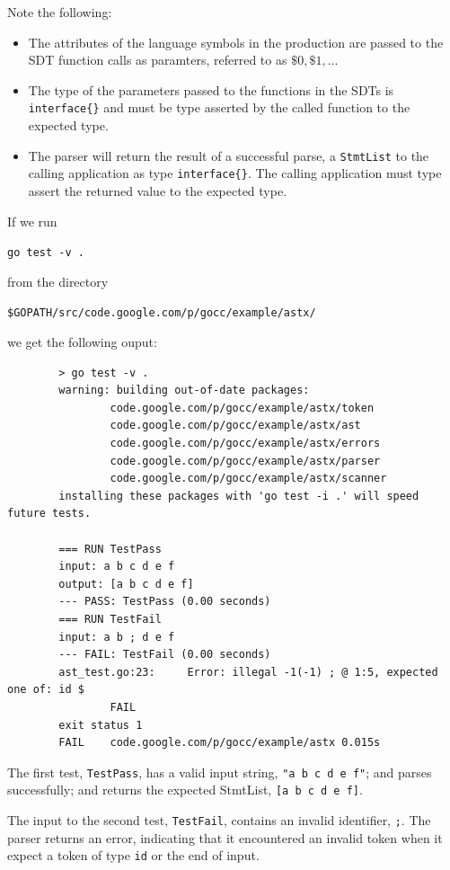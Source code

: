 \documentclass[12pt]{article}
\begin{document}
	Note the following:

	\begin{itemize}
		\item The attributes of the language symbols in the production are passed to the SDT function calls as paramters, referred to as $\$0, \$1, ...$

		\item The type of the parameters passed to the functions in the SDTs is \verb|interface{}| and must be type asserted by the called function to the expected type.

		\item The parser will return the result of a successful parse, a \verb"StmtList" to the calling application as type \verb"interface{}". The calling application must type assert the returned value to the expected type.
	\end{itemize}

	If we run 

	\verb"go test -v ." 

	from the directory 

	\verb|$GOPATH/src/code.google.com/p/gocc/example/astx/| 

	we get the following ouput:

	\begin{verbatim}
		> go test -v .
		warning: building out-of-date packages:
		        code.google.com/p/gocc/example/astx/token
		        code.google.com/p/gocc/example/astx/ast
		        code.google.com/p/gocc/example/astx/errors
		        code.google.com/p/gocc/example/astx/parser
		        code.google.com/p/gocc/example/astx/scanner
		installing these packages with 'go test -i .' will speed future tests.

		=== RUN TestPass
		input: a b c d e f
		output: [a b c d e f]
		--- PASS: TestPass (0.00 seconds)
		=== RUN TestFail
		input: a b ; d e f
		--- FAIL: TestFail (0.00 seconds)
		ast_test.go:23: 	Error: illegal -1(-1) ; @ 1:5, expected one of: id $
		        FAIL
		exit status 1
		FAIL	code.google.com/p/gocc/example/astx	0.015s	\end{verbatim}

	The first test, \verb"TestPass", has a valid input string, \verb|"a b c d e f"|; and parses successfully; and returns the expected StmtList, \verb|[a b c d e f]|.

	The input to the second test, \verb|TestFail|, contains an invalid identifier, \verb|;|. The parser returns an error, indicating that it encountered an invalid token when it expect a token of type \verb|id| or the end of input.
\end{document}
